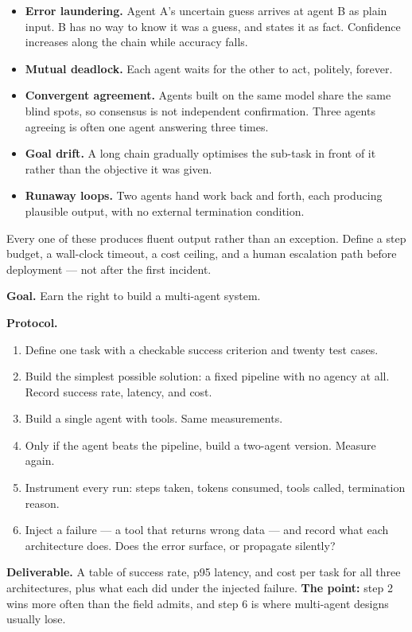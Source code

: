 \begin{cautionbox}
\begin{itemize}
  \item \textbf{Error laundering.} Agent A's uncertain guess arrives at agent B
        as plain input. B has no way to know it was a guess, and states it as
        fact. Confidence increases along the chain while accuracy falls.
  \item \textbf{Mutual deadlock.} Each agent waits for the other to act,
        politely, forever.
  \item \textbf{Convergent agreement.} Agents built on the same model share the
        same blind spots, so consensus is not independent confirmation. Three
        agents agreeing is often one agent answering three times.
  \item \textbf{Goal drift.} A long chain gradually optimises the sub-task in
        front of it rather than the objective it was given.
  \item \textbf{Runaway loops.} Two agents hand work back and forth, each
        producing plausible output, with no external termination condition.
\end{itemize}
Every one of these produces fluent output rather than an exception. Define a
step budget, a wall-clock timeout, a cost ceiling, and a human escalation path
before deployment --- not after the first incident.
\end{cautionbox}

\begin{practicallab}
\textbf{Goal.} Earn the right to build a multi-agent system.

\textbf{Protocol.}
\begin{enumerate}
  \item Define one task with a checkable success criterion and twenty test
        cases.
  \item Build the simplest possible solution: a fixed pipeline with no agency
        at all. Record success rate, latency, and cost.
  \item Build a single agent with tools. Same measurements.
  \item Only if the agent beats the pipeline, build a two-agent version.
        Measure again.
  \item Instrument every run: steps taken, tokens consumed, tools called,
        termination reason.
  \item Inject a failure --- a tool that returns wrong data --- and record what
        each architecture does. Does the error surface, or propagate silently?
\end{enumerate}

\textbf{Deliverable.} A table of success rate, p95 latency, and cost per task
for all three architectures, plus what each did under the injected failure.
\textbf{The point:} step 2 wins more often than the field admits, and step 6 is
where multi-agent designs usually lose.
\end{practicallab}

